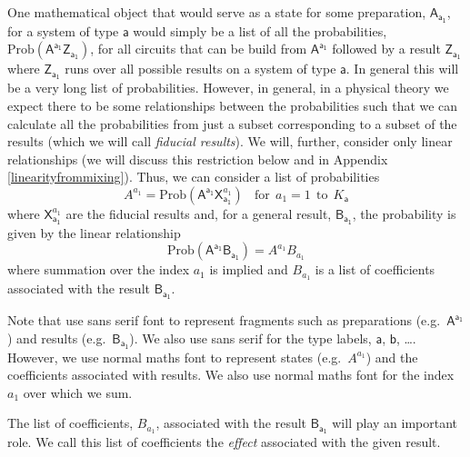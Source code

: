 \documentclass[10pt]{article}
\begin{document}
One mathematical object that would serve as a state for some preparation, $\mathsf{A_{a_1}}$, for a system of type $\mathsf a$ would simply be a list of all the probabilities, $\text{Prob}(\mathsf{A^{a_1}Z_{a_1}})$, for all circuits that can be build from $\mathsf{ A^{a_1}}$ followed by a result $\mathsf{Z_{a_1}}$ where $\mathsf{Z_{a_1}}$ runs over all possible results on a system of type $\mathsf a$.  In general this will be a very long list of probabilities.  However, in general, in a physical theory we expect there to be some relationships between the probabilities such that we can calculate all the probabilities from just a subset corresponding to a subset of the results (which we will call \emph{fiducial results}).  We will, further, consider only linear relationships (we will discuss this restriction below and in Appendix \ref{linearityfrommixing}).  Thus, we can consider a list of probabilities
\begin{equation}
A^{a_1}= \text{Prob}(\mathsf{A}^\mathsf{a_1}\mathsf{X}_\mathsf{a_1}^{a_1}) ~~~~\text{for}~~ a_1=1 ~~\text{to} ~~K_{\mathsf a}
\end{equation}
where $\mathsf{X}_\mathsf{a_1}^{a_1}$ are the fiducial results and, for a general result, $\mathsf{B_{a_1}}$, the probability is given by the linear relationship
\begin{equation}\label{probAB}
\text{Prob}(\mathsf{A^{a_1}B_{a_1}})= A^{a_1}B_{a_1}
\end{equation}
where summation over the index $a_1$ is implied and $B_{a_1}$ is a list of coefficients associated with the result $\mathsf{B_{a_1}}$.

Note that use sans serif font to represent fragments such as preparations (e.g.\ $\mathsf{A^{a_1}}$) and results (e.g.\ $\mathsf{B_{a_1}}$).  We also use sans serif for the type labels, $\mathsf{a}$, $\mathsf{b}$, \dots.  However, we use normal maths font to represent states (e.g.\ $A^{a_1}$) and the coefficients associated with results.  We also use normal maths font for the index $a_1$ over which we sum.

The list of coefficients, $B_{a_1}$, associated with the result $\mathsf{B_{a_1}}$ will play an important role.  We call this list of coefficients the \emph{effect} associated with the given result.
\end{document}

